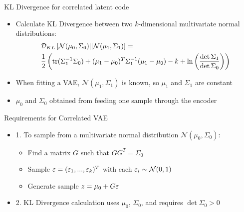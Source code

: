 \documentclass{beamer}
\def \e{\ensuremath \varepsilon}
\def \tr{\ensuremath \text{tr}}
\theoremstyle{definition}
\begin{document}
\begin{frame}{KL Divergence for correlated latent code}
\begin{itemize}
  \item Calculate KL Divergence between two $k$-dimensional multivariate normal distributions:
\begin{align*}
&\mathcal{D}_{KL}\left[\mathcal{N}(\mu_0, \Sigma_0) || \mathcal{N}(\mu_1, \Sigma_1)\right] = \\
&\frac{1}{2} \left(\tr(\Sigma_1^{-1} \Sigma_0) + (\mu_1 - \mu_0)^T \Sigma_1^{-1} (\mu_1 - \mu_0) - k + \ln\left(\frac{\det \Sigma_1}{\det \Sigma_0} \right) \right)
\end{align*}
  \item<2-> When fitting a VAE, $\mathcal{N}(\mu_1, \Sigma_1)$ is known, so $\mu_1$ and $\Sigma_1$ are constant
  \item<2-> $\mu_0$ and $\Sigma_0$ obtained from feeding one sample through the encoder
\end{itemize}
\end{frame}


\begin{frame}{Requirements for Correlated VAE}
\begin{itemize}
  \item 1. To sample from a multivariate normal distribution $\mathcal{N}(\mu_0, \Sigma_0)$:
  \begin{itemize}
    \item Find a matrix $G$ such that $G G^T = \Sigma_0$
    \item Sample $\e = (\e_1,...,\e_k)^T$ with each $\e_i \sim \mathcal{N}(0,1)$
    \item Generate sample $z = \mu_0 + G\e$
  \end{itemize}
\item<2-> 2. KL Divergence calculation uses $\mu_0$, $\Sigma_0$, and requires $\det \Sigma_0 > 0$
\end{itemize}
\end{frame}
\end{document}
